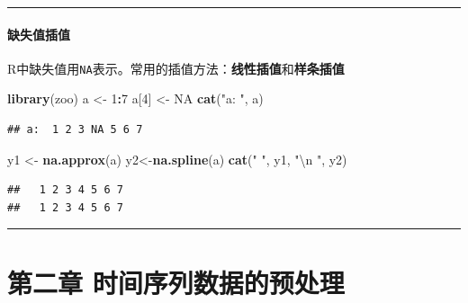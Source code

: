 \documentclass[]{article}
\newenvironment{Shaded}{\begin{snugshade}}{\end{snugshade}}
\newcommand{\CharTok}[1]{\textcolor[rgb]{0.31,0.60,0.02}{#1}}
\newcommand{\DecValTok}[1]{\textcolor[rgb]{0.00,0.00,0.81}{#1}}
\newcommand{\KeywordTok}[1]{\textcolor[rgb]{0.13,0.29,0.53}{\textbf{#1}}}
\newcommand{\NormalTok}[1]{#1}
\newcommand{\OperatorTok}[1]{\textcolor[rgb]{0.81,0.36,0.00}{\textbf{#1}}}
\newcommand{\OtherTok}[1]{\textcolor[rgb]{0.56,0.35,0.01}{#1}}
\newcommand{\StringTok}[1]{\textcolor[rgb]{0.31,0.60,0.02}{#1}}
\let\oldparagraph\paragraph
\renewcommand{\paragraph}[1]{\oldparagraph{#1}\mbox{}}
\begin{document}
\begin{center}\rule{0.5\linewidth}{\linethickness}\end{center}

\hypertarget{ux7f3aux5931ux503cux63d2ux503c}{%
\paragraph{缺失值插值}\label{ux7f3aux5931ux503cux63d2ux503c}}

R中缺失值用\texttt{NA}表示。常用的插值方法：\textbf{线性插值}和\textbf{样条插值}

\begin{Shaded}
\begin{Highlighting}[]
\KeywordTok{library}\NormalTok{(zoo)}
\NormalTok{a <-}\StringTok{ }\DecValTok{1}\OperatorTok{:}\DecValTok{7}
\NormalTok{a[}\DecValTok{4}\NormalTok{] <-}\StringTok{ }\OtherTok{NA}
\KeywordTok{cat}\NormalTok{(}\StringTok{"a: "}\NormalTok{, a)}
\end{Highlighting}
\end{Shaded}

\begin{verbatim}
## a:  1 2 3 NA 5 6 7
\end{verbatim}

\begin{Shaded}
\begin{Highlighting}[]
\NormalTok{y1 <-}\StringTok{ }\KeywordTok{na.approx}\NormalTok{(a)}
\NormalTok{y2<-}\KeywordTok{na.spline}\NormalTok{(a)}
\KeywordTok{cat}\NormalTok{(}\StringTok{" "}\NormalTok{, y1, }\StringTok{"}\CharTok{\textbackslash{}n}\StringTok{ "}\NormalTok{, y2)}
\end{Highlighting}
\end{Shaded}

\begin{verbatim}
##   1 2 3 4 5 6 7 
##   1 2 3 4 5 6 7
\end{verbatim}

\begin{center}\rule{0.5\linewidth}{\linethickness}\end{center}

\hypertarget{ux7b2cux4e8cux7ae0-ux65f6ux95f4ux5e8fux5217ux6570ux636eux7684ux9884ux5904ux7406}{%
\section{第二章
时间序列数据的预处理}\label{ux7b2cux4e8cux7ae0-ux65f6ux95f4ux5e8fux5217ux6570ux636eux7684ux9884ux5904ux7406}}
\end{document}
